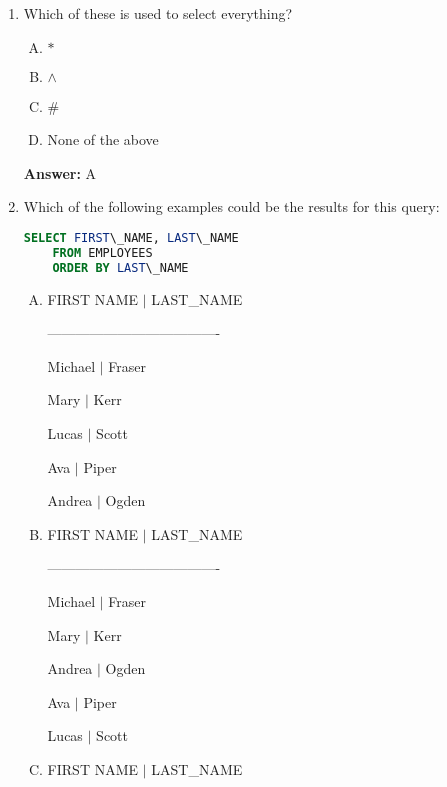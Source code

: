 \documentclass[12pt]{article}
\begin{document}
\begin{enumerate}[1.]
    \item

    Which of these is used to select everything?

    \begin{enumerate}[A.]
        \item $\ast$
        \item $\wedge$
        \item \#
        \item None of the above
    \end{enumerate}

    \bigskip

    \textbf{Answer:} A

    \item

    Which of the following examples could be the results for this query:

    \bigskip

    \begin{lstlisting}[language=SQL]
    SELECT FIRST\_NAME, LAST\_NAME
    FROM EMPLOYEES
    ORDER BY LAST\_NAME
    \end{lstlisting}

    \bigskip

    \begin{enumerate}[A.]
        \item
        FIRST NAME     $\vert$    LAST\_NAME

        -------------------------------------

        Michael $\vert$ Fraser

        Mary $\vert$  Kerr

        Lucas $\vert$ Scott

        Ava $\vert$   Piper

        Andrea $\vert$ Ogden
        \item
        FIRST NAME     $\vert$    LAST\_NAME

        -------------------------------------

        Michael $\vert$ Fraser

        Mary $\vert$  Kerr

        Andrea $\vert$ Ogden

        Ava $\vert$   Piper

        Lucas $\vert$ Scott
        \item
        FIRST NAME     $\vert$    LAST\_NAME


\end{enumerate}
\end{enumerate}
\end{document}
